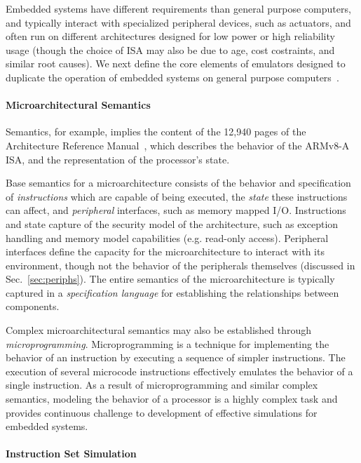Embedded systems have different requirements than general purpose computers, and typically interact with specialized peripheral devices, such as actuators, and often run on different architectures designed for low power or high reliability usage (though the choice of ISA may also be due to age, cost costraints, and similar root causes).
We next define the core elements of emulators designed to duplicate the operation of embedded systems on general purpose computers~\cite{armstrong2019isa}.

\paragraph{Microarchitectural Semantics}

Semantics, for example, implies the content of the 12,940 pages of the Architecture Reference Manual~\cite{arm2023ref}, which describes the behavior of the ARMv8-A ISA, and the representation of the processor's state.

Base semantics for a microarchitecture consists of the behavior and specification of \emph{instructions} which are capable of being executed, the \emph{state} these instructions can affect, and \emph{peripheral} interfaces, such as memory mapped I/O.
Instructions and state capture of the security model of the architecture, such as exception handling and memory model capabilities (e.g. read-only access).
Peripheral interfaces define the capacity for the microarchitecture to interact with its environment, though not the behavior of the peripherals themselves (discussed in Sec.~\ref{sec:periphs}).
The entire semantics of the microarchitecture is typically captured in a \emph{specification language} for establishing the relationships between components.

Complex microarchitectural semantics may also be established through \emph{microprogramming}.
Microprogramming is a technique for implementing the behavior of an instruction by executing a sequence of simpler instructions.
The execution of several microcode instructions effectively emulates the behavior of a single instruction.
As a result of microprogramming and similar complex semantics, modeling the behavior of a processor is a highly complex task and provides continuous challenge to development of effective simulations for embedded systems.

\paragraph{Instruction Set Simulation}

